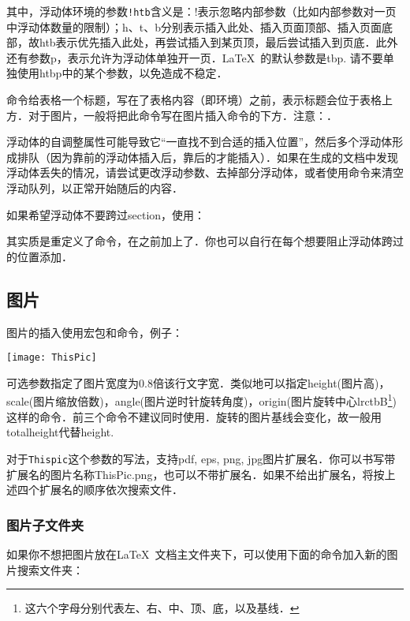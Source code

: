其中，浮动体环境的参数\verb|!htb|含义是：!表示忽略内部参数（比如内部参数对一页中浮动体数量的限制）；h、t、b分别表示插入此处、插入页面顶部、插入页面底部，故htb表示优先插入此处，再尝试插入到某页顶，最后尝试插入到页底．此外还有参数p，表示允许为浮动体单独开一页．\LaTeX\ 的默认参数是tbp. 请不要单独使用htbp中的某个参数，以免造成不稳定．

命令给表格一个标题，写在了表格内容（即环境）之前，表示标题会位于表格上方．对于图片，一般将把此命令写在图片插入命令的下方．注意：．\dpar

浮动体的自调整属性可能导致它“一直找不到合适的插入位置”，然后多个浮动体形成排队（因为靠前的浮动体插入后，靠后的才能插入）．如果在生成的文档中发现浮动体丢失的情况，请尝试更改浮动参数、去掉部分浮动体，或者使用命令来清空浮动队列，以正常开始随后的内容．

如果希望浮动体不要跨过section，使用：
\begin{latex}
\usepackage[section]{placeins}
\end{latex}

其实质是重定义了命令，在之前加上了．你也可以自行在每个想要阻止浮动体跨过的位置添加．

\subsection{图片}
图片的插入使用宏包和命令，例子：
\begin{latex}
\begin{center}
    \texttt{[image: ThisPic]}
\end{center}
\end{latex}

可选参数指定了图片宽度为0.8倍该行文字宽．类似地可以指定height(图片高)，scale(图片缩放倍数)，angle(图片逆时针旋转角度)，origin(图片旋转中心lrctbB\footnote{这六个字母分别代表左、右、中、顶、底，以及基线．})这样的命令．前三个命令不建议同时使用．旋转的图片基线会变化，故一般用totalheight代替height. 

对于\texttt{Thispic}这个参数的写法，\xelatex 支持pdf, eps, png, jpg图片扩展名．你可以书写带扩展名的图片名称ThisPic.png，也可以不带扩展名．如果不给出扩展名，将按上述四个扩展名的顺序依次搜索文件．\dpar

\subsubsection{图片子文件夹}
如果你不想把图片放在\LaTeX\ 文档主文件夹下，可以使用下面的命令加入新的图片搜索文件夹：
\begin{latex}
\graphicspath{{c:/pics/}{./pic/}}
\end{latex}

